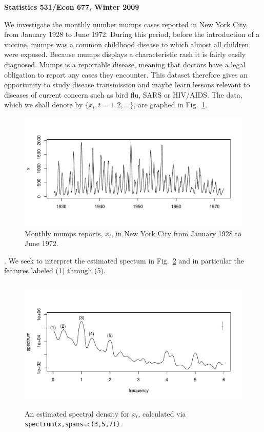 \documentclass[11pt]{article}
\def\bc{\begin{center}}
\def\ec{\end{center}}
\begin{document}
\begin{center}
{\bf Statistics 531/Econ 677, Winter 2009}
\end{center}
We investigate the monthly number mumps cases reported in New York City,
 from January 1928 to June 1972. 
During this period, before the introduction of a vaccine, mumps was a common childhood disease to which almost all children were exposed.
Because mumps displays a characteristic rash it is fairly easily diagnosed. Mumps is a reportable disease, meaning that doctors have  a legal obligation to report any cases they encounter.
This dataset therefore gives an opportunity to study disease transmission and maybe learn lessons relevant to diseases of current concern such as bird flu, SARS or HIV/AIDS.
The data, which we shall denote by $\{x_t,t=1,2,\dots\}$, are graphed in Fig.~\ref{fig:data}.


\begin{figure}[h]
\bc
\vspace{-1cm}
\includegraphics[width=6in]{mumps}
\vspace{-1.8cm}
\ec
\caption{Monthly mumps reports, $x_t$, in New York City from January 1928 to June 1972.}\label{fig:data}
\end{figure}



. We seek to interpret the estimated spectum in Fig.~\ref{fig:spec} and in particular the features labeled (1) through (5).


\begin{figure}[h]
\bc\vspace{-1cm}
\includegraphics[width=6in,height=2.5in]{mumps-spec}
\ec\vspace{-1cm}
\caption{An estimated spectral density for $x_t$, calculated via \texttt{spectrum(x,spans=c(3,5,7))}.}\label{fig:spec}
\end{figure}
\end{document}
